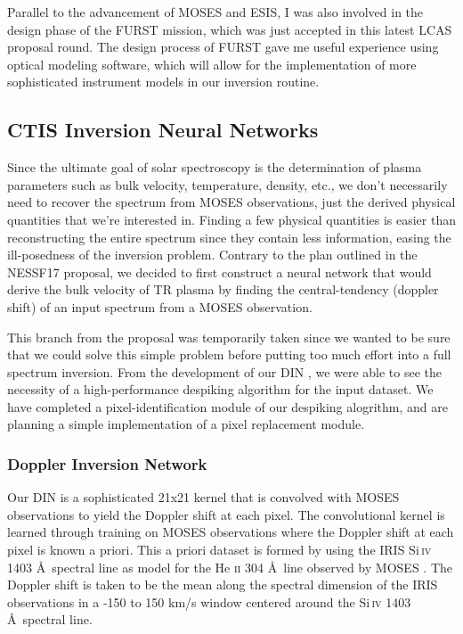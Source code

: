 \documentclass[10pt,letterpaper]{article}
\newcommand{\SiIV}{Si\,\textsc{iv} 1403 \AA\ }
\newcommand{\HeII}{He \textsc{ii} 304 \AA\ }
\newcommand{\TR}{\ac{TR} }
\newcommand{\MOSES}{\ac{MOSES} }
\newcommand{\DIN}{\ac{DIN} }
\begin{document}
		Parallel to the advancement of MOSES and ESIS, I was also involved in the design phase of the FURST mission, which was just accepted in this latest LCAS proposal round.
		The design process of FURST gave me useful experience using optical modeling software, which will allow for the implementation of more sophisticated instrument models in our inversion routine.
	
		\subsection{CTIS Inversion Neural Networks}
		
			Since the ultimate goal of solar spectroscopy is the determination of plasma parameters such as bulk velocity, temperature, density, etc., we don't necessarily need to recover the spectrum from \MOSES observations, just the derived physical quantities that we're interested in. 
			Finding a few physical quantities is easier than reconstructing the entire spectrum since they contain less information, easing the ill-posedness of the inversion problem.
			Contrary to the plan outlined in the NESSF17 proposal, we decided to first construct a neural network that would derive the bulk velocity of \TR plasma by finding the central-tendency (doppler shift) of an input spectrum from a MOSES observation.

			This branch from the proposal was temporarily taken since we wanted to be sure that we could solve this simple problem before putting too much effort into a full spectrum inversion.
			From the development of our \DIN, we were able to see the necessity of a high-performance despiking algorithm for the input dataset.
			We have completed a pixel-identification module of our despiking alogrithm, and are planning a simple implementation of a pixel replacement module.
				
			\subsubsection{Doppler Inversion Network}
				
				Our \DIN is a sophisticated 21x21 kernel that is convolved with MOSES observations to yield the Doppler shift at each pixel.
				The convolutional kernel is learned through training on MOSES observations where the Doppler shift at each pixel is known a priori.
				This a priori dataset is formed by using the IRIS \SiIV spectral line as model for the \HeII line observed by \MOSES.
				The Doppler shift is taken to be the mean along the spectral dimension of the IRIS observations in a -150 to 150 km/s window centered around the \SiIV spectral line.
				
\end{document}
